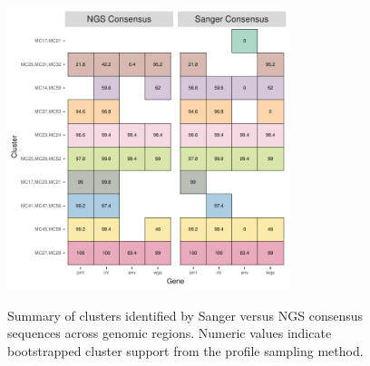 \documentclass[letterpaper]{article}
\begin{document}
\newpage

\begin{figure}[p!]
	\caption{Summary of clusters identified by Sanger versus NGS consensus sequences across genomic regions. Numeric values indicate bootstrapped cluster support from the profile sampling method.}
	\centering
	\includegraphics[width=3.25in]{Figure6}
	\label{fig6}
\end{figure}
\end{document}
